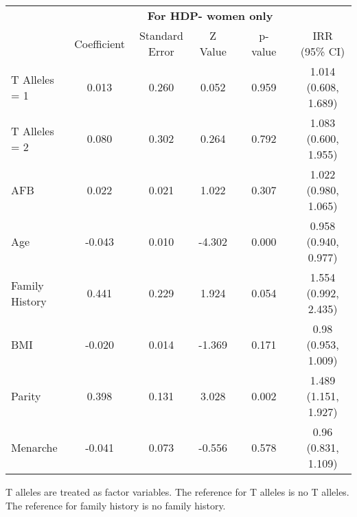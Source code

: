 \documentclass{standalone}
\begin{document}
\begin{threeparttable}
\begin{tabular}{@{}lccccccc@{}}
  \\
    & \multicolumn{7}{c}{\textbf{For HDP- women only}} \\
   \cmidrule{2-8}
   & Coefficient & Standard Error & Z Value & \hspace{1em} & p-value & \hspace{1em} & IRR (95\% CI) \\ 
   \midrule
  T Alleles = 1\phantom{hdpxx} & 0.013 & 0.260 & 0.052 && 0.959 && 1.014 (0.608, 1.689) \\ 
  T Alleles = 2 & 0.080 & 0.302 & 0.264 && 0.792 && 1.083 (0.600, 1.955) \\ 
  AFB & 0.022 & 0.021 & 1.022 && 0.307 && 1.022 (0.980, 1.065) \\ 
  Age & -0.043 & 0.010 & -4.302 && 0.000 && 0.958 (0.940, 0.977) \\ 
  Family History & 0.441 & 0.229 & 1.924 && 0.054 && 1.554 (0.992, 2.435) \\ 
  BMI & -0.020 & 0.014 & -1.369 && 0.171 && 0.98 (0.953, 1.009) \\ 
  Parity & 0.398 & 0.131 & 3.028 && 0.002 && 1.489 (1.151, 1.927) \\ 
  Menarche & -0.041 & 0.073 & -0.556 && 0.578 && 0.96 (0.831, 1.109) \\
   \bottomrule
\end{tabular}
\captionsetup{justification   = raggedright,
              singlelinecheck = false}
\caption*{T alleles are treated as factor variables. The reference for T alleles is no T alleles. The reference for family history is no family history.}
\end{threeparttable}
\end{document}
